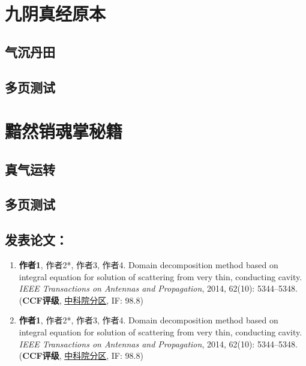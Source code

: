\documentclass[print, doctor, vlined]{DissertUESTC}
\begin{document}
	
	
	
	\appendix
	
	\chapter{九阴真经原本}
	\section{气沉丹田}
	\newpage
	\section{多页测试}
	
	\chapter{黯然销魂掌秘籍}
	\section{真气运转}
	\newpage
	\section{多页测试}
	
	\achievement %
	
	\section*{发表论文：}
	
	\begin{enumerate}
	    \item \textbf{作者1}, 作者2*, 作者3, 作者4. Domain decomposition method based on integral equation for solution of scattering from very thin, conducting cavity. \emph{IEEE Transactions on Antennas and Propagation}, 2014, 62(10): 5344--5348. (\textbf{CCF评级}, \underline{中科院分区}, IF: 98.8)
	    
		\setcounter{enumi}{98}
	    
		\item \textbf{作者1}, 作者2*, 作者3, 作者4. Domain decomposition method based on integral equation for solution of scattering from very thin, conducting cavity. \emph{IEEE Transactions on Antennas and Propagation}, 2014, 62(10): 5344--5348. (\textbf{CCF评级}, \underline{中科院分区}, IF: 98.8)
	\end{enumerate}
	
\end{document}

